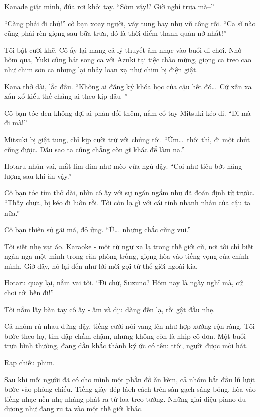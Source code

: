 \documentclass[../main.tex]{subfiles}
\begin{document}
Kanade giật mình, đũa rơi khỏi tay. ``Sớm vậy!? Giờ nghỉ trưa mà--''

``Càng phải đi chứ!'' cô bạn xoay người, váy tung bay như vũ công rối. ``Ca sĩ nào cũng phải rèn giọng sau bữa trưa, đó là thời điểm thanh quản nở nhất!''

Tôi bật cười khẽ. Cô ấy lại mang cả lý thuyết âm nhạc vào buổi đi chơi. Nhớ hôm qua, Yuki cũng hát song ca với Azuki tại tiệc chào mừng, giọng ca treo cao như chim sơn ca nhưng lại nhảy loạn xạ như chim bị điện giật.

Kana thở dài, lắc đầu. ``Không ai đăng ký khóa học của cậu hết đó\dots\ Cứ xấn xa xấn xổ kiểu thế chẳng ai theo kịp đâu--''

Cô bạn tóc đen không đợi ai phản đối thêm, nắm cổ tay Mitsuki kéo đi. ``Đi mà đi mà!''

Mitsuki bị giật tung, chỉ kịp cười trừ với chúng tôi. ``Ừm\dots\ thôi thì, đi một chút cũng được. Dẫu sao ta cũng chẳng còn gì khác để làm na.''

Hotaru nhún vai, mắt lim dim như mèo vừa ngủ dậy. ``Coi như tiêu bớt năng lượng sau khi ăn vậy.''

Cô bạn tóc tím thở dài, nhìn cô ấy với sự ngán ngẩm như đã đoán định từ trước. ``Thấy chưa, bị kéo đi luôn rồi. Tôi còn lạ gì với cái tính nhanh nhảu của cậu ta nữa.''

Cô bạn thiên sứ gãi má, đỏ ửng. ``Ừ\dots\ nhưng chắc cũng vui.''

Tôi siết nhẹ vạt áo. Karaoke - một từ ngữ xa lạ trong thế giới cũ, nơi tôi chỉ biết ngân nga một mình trong căn phòng trống, giọng hòa vào tiếng vọng của chính mình. Giờ đây, nó lại đến như lời mời gọi từ thế giới ngoài kia.

Hotaru quay lại, nắm vai tôi. ``Đi chứ, Suzuno? Hôm nay là ngày nghỉ mà, cứ chơi tới bến đi!''

Tôi nắm lấy bàn tay cô ấy - ấm và dịu dàng đến lạ, rồi gật đầu nhẹ.

Cả nhóm rủ nhau đứng dậy, tiếng cười nói vang lên như hợp xướng rộn ràng. Tôi bước theo họ, tim đập chầm chậm, nhưng không còn là nhịp cô đơn. Một buổi trưa bình thường, đang dần khắc thành ký ức có tên: ttôi, người được mời hát.

\begin{center}
  \uline{Rạp chiếu phim.}
\end{center}

Sau khi mỗi người đã có cho mình một phần đồ ăn kèm, cả nhóm bắt đầu lũ lượt bước vào phòng chiếu. Tiếng giày dép lách cách trên sàn gạch sáng bóng, hòa vào tiếng nhạc nền nhẹ nhàng phát ra từ loa treo tường. Những giai điệu piano du dương như đang ru ta vào một thế giới khác.
\end{document}

